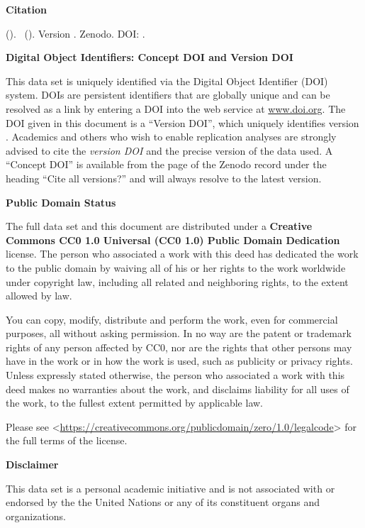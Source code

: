 \textbf{Citation}

\emph{\projectauthor} (\the\year ). \datatitle\ (\datashort ). Version \version . Zenodo. DOI: \dataversiondoi .

\vspace{0.5cm}

\textbf{Digital Object Identifiers: Concept DOI and Version DOI}

This data set is uniquely identified via the Digital Object Identifier (DOI) system. DOIs are persistent identifiers that are globally unique and can be resolved as a link by entering a DOI into the web service at \url{www.doi.org}. The DOI given in this document is a \enquote{Version DOI}, which uniquely identifies version \version. Academics and others who wish to enable replication analyses are strongly advised to cite the \emph{version DOI} and the precise version of the data used. A \enquote{Concept DOI} is available from the page of the Zenodo record under the heading \enquote{Cite all versions?} and will always resolve to the latest version.

\vspace{0.5cm}



\textbf{Public Domain Status}

The full data set and this document are distributed under a \textbf{Creative Commons CC0 1.0 Universal (CC0 1.0) Public Domain Dedication} license. The person who associated a work with this deed has dedicated the work to the public domain by waiving all of his or her rights to the work worldwide under copyright law, including all related and neighboring rights, to the extent allowed by law.

You can copy, modify, distribute and perform the work, even for commercial purposes, all without asking permission. In no way are the patent or trademark rights of any person affected by CC0, nor are the rights that other persons may have in the work or in how the work is used, such as publicity or privacy rights. Unless expressly stated otherwise, the person who associated a work with this deed makes no warranties about the work, and disclaims liability for all uses of the work, to the fullest extent permitted by applicable law. 

Please see <\url{https://creativecommons.org/publicdomain/zero/1.0/legalcode}> for the full terms of the license.


\vspace{0.5cm}

\textbf{Disclaimer} 

This data set is a personal academic initiative and is not associated with or endorsed by the the United Nations or any of its constituent organs and organizations.


\newpage